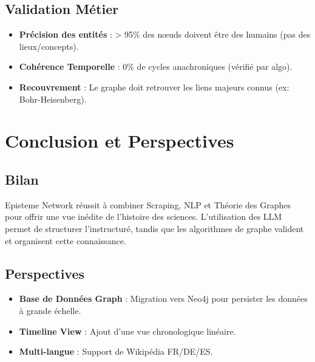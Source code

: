 \documentclass[12pt,a4paper]{report}
\begin{document}
\section{Validation Métier}
\begin{info}
\begin{itemize}
    \item \textbf{Précision des entités} : > 95\% des nœuds doivent être des humains (pas des lieux/concepts).
    \item \textbf{Cohérence Temporelle} : 0\% de cycles anachroniques (vérifié par algo).
    \item \textbf{Recouvrement} : Le graphe doit retrouver les liens majeurs connus (ex: Bohr-Heisenberg).
\end{itemize}
\end{info}

\chapter{Conclusion et Perspectives}

\section{Bilan}
Episteme Network réussit à combiner Scraping, NLP et Théorie des Graphes pour offrir une vue inédite de l'histoire des sciences. L'utilisation des LLM permet de structurer l'instructuré, tandis que les algorithmes de graphe valident et organisent cette connaissance.

\section{Perspectives}
\begin{itemize}
    \item \textbf{Base de Données Graph} : Migration vers Neo4j pour persister les données à grande échelle.
    \item \textbf{Timeline View} : Ajout d'une vue chronologique linéaire.
    \item \textbf{Multi-langue} : Support de Wikipédia FR/DE/ES.
\end{itemize}
\end{document}
